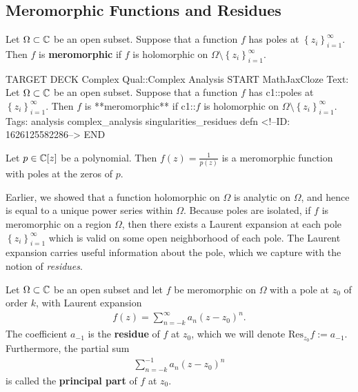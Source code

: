 \documentclass{memoir}
\begin{document}


\subsection{Meromorphic Functions and Residues}
\label{sub:meromorphic_functions_and_residues}



\begin{defn}
	Let \(\Omega \subset \mathbb{C}\) be an open subset. Suppose that a function \(f\) has poles at \(\left\{ z_i \right\}_{i=1}^{\infty}\). Then \(f\) is \textbf{meromorphic} if \(f\) is holomorphic on \(\Omega \setminus\left\{ z_i \right\}_{i=1}^{\infty}\).
\end{defn}

\begin{anki}
TARGET DECK
Complex Qual::Complex Analysis
START
MathJaxCloze
Text: Let \(\Omega \subset \mathbb{C}\) be an open subset. Suppose that a function \(f\) has {{c1::poles at \(\left\{ z_i \right\}_{i=1}^{\infty}\)}}. Then \(f\) is **meromorphic** if {{c1::\(f\) is holomorphic on \(\Omega \setminus\left\{ z_i \right\}_{i=1}^{\infty}\)}}.
Tags: analysis complex_analysis singularities_residues defn
<!--ID: 1626125582286-->
END
\end{anki}


\begin{exmp}[Polynomials]
	Let \(p \in \mathbb{C}[z]\) be a polynomial. Then \(f(z) = \frac{1}{p(z)}\) is a meromorphic function with poles at the zeros of \(p\).
\end{exmp}

Earlier, we showed that a function holomorphic on \(\Omega \) is analytic on \(\Omega \), and hence is equal to a unique power series within \(\Omega \). Because poles are isolated, if \(f\) is meromorphic on a region \(\Omega \), then there exists a Laurent expansion at each pole \(\left\{ z_i \right\}_{i=1}^{\infty}\) which is valid on some open neighborhood of each pole. The Laurent expansion carries useful information about the pole, which we capture with the notion of \textit{residues}.

\begin{defn}[Residue]
	Let \(\Omega \subset \mathbb{C}\) be an open subset and let \(f\) be meromorphic on \(\Omega \) with a pole at \(z_0\) of order \(k\), with Laurent expansion
	\begin{align*}
		f(z) = \sum_{n=-k}^{\infty} a_n (z-z_0)^{n}.
	\end{align*}
	The coefficient \(a_{-1}\) is the \textbf{residue} of \(f\) at \(z_0\), which we will denote \(\textrm{Res}_{z_0}f := a_{-1}\). Furthermore, the partial sum
	\begin{align*}
		\sum_{n=-k}^{-1} a_n (z-z_0)^{n}
	\end{align*}
	is called the \textbf{principal part} of \(f\) at \(z_0\).
\end{defn}
\end{document}
